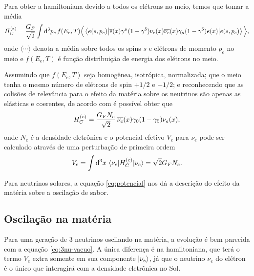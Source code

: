 \documentclass[12pt]{report}
\begin{document}
Para obter a hamiltoniana devido a todos os elétrons no meio, temos que tomar a média
$$
H_C^{(e)} = \frac{G_F}{\sqrt{2}} \int \dd[3]{p_e} f(E_e, T)
\Big\langle \ev**{\cc{e}(x) \gamma^\mu (1-\gamma^5) \nu_e(x)
\cc{\nu_e}(x) \gamma_\mu (1-\gamma^5) e(x)}{e(s, p_e)} \Big\rangle,
$$
onde $\Big\langle \cdots \Big\rangle$ denota a média sobre todos os spins $s$ e elétrons de momento $p_e$ no meio e $f(E_e, T)$ é função distribuição de energia dos elétrons no meio.

Assumindo que $f(E_e, T)$ seja homogênea, isotrópica, normalizada; que o meio tenha o mesmo número de elétrons de spin $+1/2$ e $-1/2$; e reconhecendo que as colisões de relevância para o efeito da matéria sobre os neutrinos são apenas as elásticas e coerentes, de acordo com \cite{gonzalez} é possível obter que
$$
H_C^{(e)} = \frac{G_F N_e}{\sqrt{2}} \, \overline{\nu_e}(x) \gamma_0 (1-\gamma_5) \nu_e(x),
$$
onde $N_e$ é a densidade eletrônica e o potencial efetivo $V_e$ para $\nu_e$ pode ser calculado através de uma perturbação de primeira ordem
\begin{equation} \label{eq:potencial}
V_e = \int \dd[3]{x} \ev{H_C^{(e)}}{\nu_e} = \sqrt{2} G_F N_e.
\end{equation}

Para neutrinos solares, a equação \ref{eq:potencial} nos dá a descrição do efeito da matéria sobre a oscilação de sabor.


\subsection{Oscilação na matéria} \label{sec:matter-osc}

Para uma geração de 3 neutrinos oscilando na matéria, a evolução é bem parecida com a equação \ref{eq:3nu-vacuo}. A única diferença é na hamiltoniana, que terá o termo $V_e$ extra somente em sua componente $\ket{\nu_e}$, já que o neutrino $\nu_e$ do elétron é o único que interagirá com a densidade eletrônica no Sol.
\end{document}
